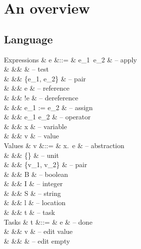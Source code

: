 
\newpage
\section{An overview}


\subsection{Language}

\begin{grammar}
  Expressions
    & e      &::= & e_1\ e_2                    & – apply \\
    &        &\mid&           & – test \\
    &        &\mid& \{e_1, e_2\}                & – pair \\
    &        &\mid& \Ref e                      & – reference \\
    &        &\mid& !e                          & – dereference \\
    &        &\mid& e_1 := e_2                  & – assign \\
    &        &\mid& e_1 \star e_2               & – operator \\
    &        &\mid& x                           & – variable \\
    &        &\mid& v                           & – value \\
  Values
    & v      &::= & \lambda x.\ e               & – abstraction \\
    &        &\mid& \{\}                        & – unit \\
    &        &\mid& \{v_1, v_2\}                & – pair \\
    &        &\mid& B \in \BB                   & – boolean \\
    &        &\mid& I \in \ZZ                   & – integer \\
    &        &\mid& S \in \SS                   & – string \\
    &        &\mid& l                           & – location \\
    &        &\mid& t                           & – task \\
  Tasks
    & t      &::= & \Done e                     & – done \\
    &        &\mid& \Edit v                     & – edit value \\
    &        &\mid& \Empty \tau                 & – edit empty \\

\end{grammar}
